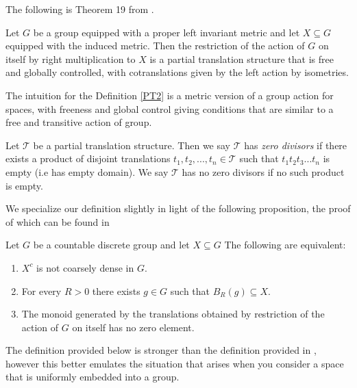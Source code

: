 \begin{corollary}
The following is Theorem 19 from \cite{MR2363428}.

\begin{lemma}\label{lem:L10}
Let $G$ be a group equipped with a proper left invariant metric and let $X \subseteq G$ equipped with the induced metric. Then the restriction of the action of $G$ on itself by right multiplication to $X$ is a partial translation structure that is free and globally controlled, with cotranslations given by the left action by isometries.
\end{lemma}

The intuition for the Definition \ref{PT2} is a metric version of a group action for spaces, with freeness and global control giving conditions that are similar to a free and transitive action of group. 

\begin{definition}\label{def:ZD1}
Let $\mathcal{T}$ be a partial translation structure. Then we say $\mathcal{T}$ has \textit{zero divisors} if there exists a product of disjoint translations $t_{1},t_{2},...,t_{n} \in \mathcal{T}$ such that $t_{1}t_{2}t_{3}...t_{n}$ is empty (i.e has empty domain). We say $\mathcal{T}$ has no zero divisors if no such product is empty.
\end{definition}
We specialize our definition slightly in light of the following proposition, the proof of which can be found in \cite[Proposition 8.1]{rosiesthesis}

\begin{proposition}\label{prop:TFAE} Let $G$ be a countable discrete group and let $X \subseteq G$
The following are equivalent:
\begin{enumerate}
\item $X^{c}$ is not coarsely dense in $G$.
\item For every $R>0$ there exists $g \in G$ such that $B_{R}(g) \subseteq X$.
\item The monoid generated by the translations obtained by restriction of the action of $G$ on itself has no zero element.
\end{enumerate}
\end{proposition}
The definition provided below is stronger than the definition provided in \cite{MR2363428}, however this better emulates the situation that arises when you consider a space that is uniformly embedded into a group. 



\end{corollary}
